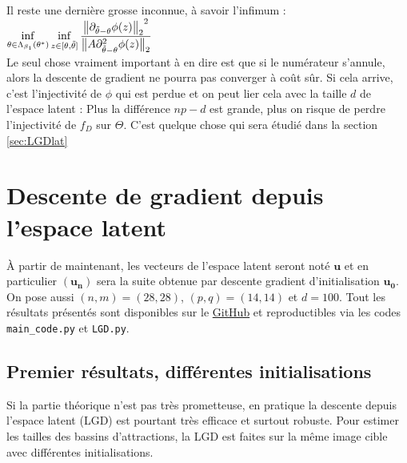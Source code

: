 \documentclass[hidelinks, french]{article} %
\renewcommand{\bf}[1]{\boldsymbol{#1}}
\theoremstyle{enonce}
\theoremstyle{special}
\theoremstyle{rq}
\theoremstyle{exo}
\theoremstyle{demo}
\begin{document}
Il reste une dernière grosse inconnue, à savoir l'infimum :\quad ${\displaystyle\inf_{\theta\in\Lambda_{\beta_1}(\theta^*)}\inf_{z\in[\theta,\Tilde{\theta}]}\frac{{\big\|\partial_{\Tilde{\theta}-\theta}\phi(z)\big\|_2}^2}{\big\|A\partial^2_{\Tilde{\theta}-\theta}\phi(z)\big\|_2}}$
\\
Le seul chose vraiment important à en dire est que si le numérateur s'annule, alors la descente de gradient ne pourra pas converger à coût sûr. Si cela arrive, c'est l'injectivité de $\phi$ qui est perdue et on peut lier cela avec la taille $d$ de l'espace latent : Plus la différence $np-d$ est grande, plus on risque de perdre l'injectivité de $f_D$ sur $\Theta$. C'est quelque chose qui sera étudié dans la section \ref{sec:LGDlat}



\newpage



\section{Descente de gradient depuis l'espace latent}\label{sec:LBD}

\`A partir de maintenant, les vecteurs de l'espace latent seront noté $\bf{u}$ et en particulier $(\bf{u_n})$ sera la suite obtenue par descente gradient d'initialisation $\bf{u_0}$. On pose aussi $(n,m)=(28,28)$, $(p,q)=(14,14)$ et $d=100$. Tout les résultats présentés sont disponibles sur le  \href{https://www.youtube.com/watch?v=dQw4w9WgXcQ&pp=ygUIcmlja3JvbGw%3D}{GitHub} et reproductibles via les codes \texttt{main\_code.py} et \texttt{LGD.py}. 



\subsection{Premier résultats, différentes initialisations}\label{sec:LDGinit}

Si la partie théorique n'est pas très prometteuse, en pratique la descente depuis l'espace latent (LGD) est pourtant très efficace et surtout robuste. Pour estimer les tailles des bassins d'attractions, la LGD est faites sur la même image cible avec différentes initialisations. 
\end{document}
